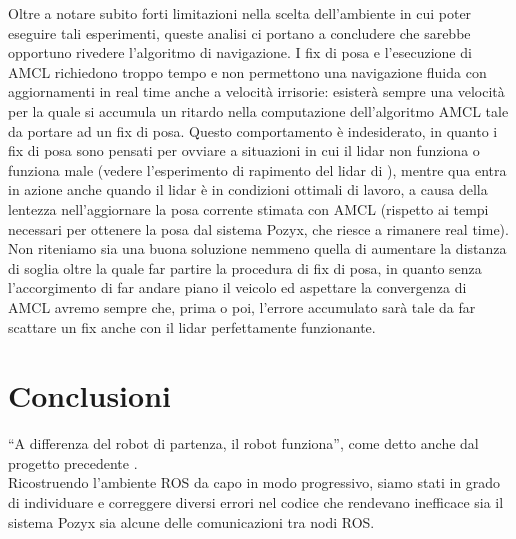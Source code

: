 \vspace{0.5cm}
Oltre a notare subito forti limitazioni nella scelta dell'ambiente in cui poter eseguire tali esperimenti, queste analisi ci portano a concludere che sarebbe opportuno rivedere l'algoritmo di navigazione. 
I fix di posa e l'esecuzione di AMCL richiedono troppo tempo e non permettono una navigazione fluida con aggiornamenti in real time anche a velocità irrisorie: esisterà sempre una velocità per la quale si accumula un ritardo nella computazione dell'algoritmo AMCL tale da portare ad un fix di posa. 
Questo comportamento è indesiderato, in quanto i fix di posa sono pensati per ovviare a situazioni in cui il lidar non funziona o funziona male (vedere l'esperimento di rapimento del lidar di \cite{ptvlocalizzazione}), mentre qua entra in azione anche quando il lidar è in condizioni ottimali di lavoro, a causa della lentezza nell'aggiornare la posa corrente stimata con AMCL (rispetto ai tempi necessari per ottenere la posa dal sistema Pozyx, che riesce a rimanere real time). 
Non riteniamo sia una buona soluzione nemmeno quella di aumentare la distanza di soglia oltre la quale far partire la procedura di fix di posa, in quanto senza l'accorgimento di far andare piano il veicolo ed aspettare la convergenza di AMCL avremo sempre che, prima o poi, l'errore accumulato sarà tale da far scattare un fix anche con il lidar perfettamente funzionante.



\newpage

\section{Conclusioni}
``A differenza del robot di partenza, il robot funziona'', come detto anche dal progetto precedente \cite{ptvlocalizzazione}.\\
Ricostruendo l'ambiente ROS da capo in modo progressivo, siamo stati in grado di individuare e correggere diversi errori nel codice che rendevano inefficace sia il sistema Pozyx sia alcune delle comunicazioni tra nodi ROS.

